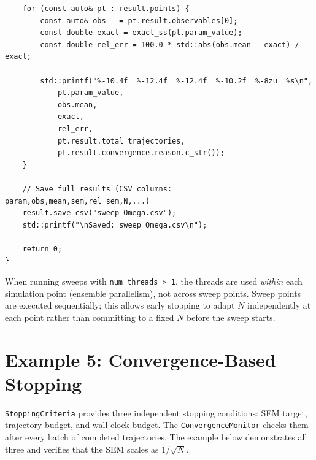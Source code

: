 \documentclass[11pt,a4paper,twoside]{book}
\newcommand{\code}[1]{\texttt{\small#1}}
\theoremstyle{definition}
\theoremstyle{remark}
\begin{document}
\begin{verbatim}
    for (const auto& pt : result.points) {
        const auto& obs   = pt.result.observables[0];
        const double exact = exact_ss(pt.param_value);
        const double rel_err = 100.0 * std::abs(obs.mean - exact) / exact;

        std::printf("%-10.4f  %-12.4f  %-12.4f  %-10.2f  %-8zu  %s\n",
            pt.param_value,
            obs.mean,
            exact,
            rel_err,
            pt.result.total_trajectories,
            pt.result.convergence.reason.c_str());
    }

    // Save full results (CSV columns: param,obs,mean,sem,rel_sem,N,...)
    result.save_csv("sweep_Omega.csv");
    std::printf("\nSaved: sweep_Omega.csv\n");

    return 0;
}
\end{verbatim}

\begin{perfbox}
  When running sweeps with \code{num\_threads > 1}, the threads are
  used \emph{within} each simulation point (ensemble parallelism),
  not across sweep points. Sweep points are executed sequentially;
  this allows early stopping to adapt $N$ independently at each point
  rather than committing to a fixed $N$ before the sweep starts.
\end{perfbox}

\section{Example 5: Convergence-Based Stopping}
\label{sec:ex-stopping}

\code{StoppingCriteria} provides three independent stopping conditions:
SEM target, trajectory budget, and wall-clock budget. The
\code{ConvergenceMonitor} checks them after every batch of completed
trajectories. The example below demonstrates all three and verifies
that the SEM scales as $1/\sqrt{N}$.
\end{document}
